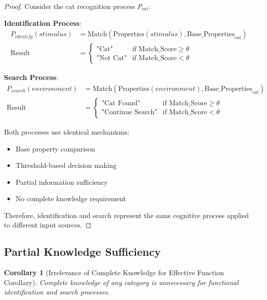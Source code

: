 \documentclass[12pt,a4paper]{article}
\newtheorem{corollary}[theorem]{Corollary}
\begin{document}
\begin{proof}
Consider the cat recognition process $P_{cat}$:

\textbf{Identification Process}:
\begin{align}
P_{identify}(stimulus) &= \text{Match}(\text{Properties}(stimulus), \text{Base\_Properties}_{cat}) \\
\text{Result} &= \begin{cases}
\text{"Cat"} & \text{if Match\_Score} \geq \theta \\
\text{"Not Cat"} & \text{if Match\_Score} < \theta
\end{cases}
\end{align}

\textbf{Search Process}:
\begin{align}
P_{search}(environment) &= \text{Match}(\text{Properties}(environment), \text{Base\_Properties}_{cat}) \\
\text{Result} &= \begin{cases}
\text{"Cat Found"} & \text{if Match\_Score} \geq \theta \\
\text{"Continue Search"} & \text{if Match\_Score} < \theta
\end{cases}
\end{align}

Both processes use identical mechanisms:
\begin{itemize}
\item Base property comparison
\item Threshold-based decision making
\item Partial information sufficiency
\item No complete knowledge requirement
\end{itemize}

Therefore, identification and search represent the same cognitive process applied to different input sources.
\end{proof}

\subsection{Partial Knowledge Sufficiency}

\begin{corollary}[Irrelevance of Complete Knowledge for Effective Function Corollary]
Complete knowledge of any category is unnecessary for functional identification and search processes.
\end{corollary}
\end{document}
